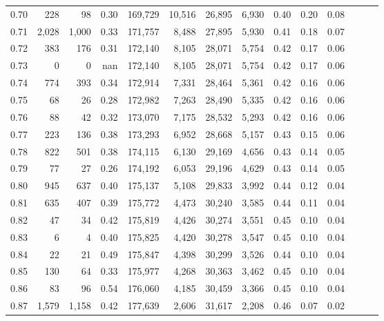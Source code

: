 \begin{tabular}{rrrrrrrrrrrrrr}
0.70 &     228 &     98 &  0.30 &  169,729 &   10,516 &  26,895 &   6,930 &  0.40 &  0.20 &      0.08 \\
0.71 &   2,028 &  1,000 &  0.33 &  171,757 &    8,488 &  27,895 &   5,930 &  0.41 &  0.18 &      0.07 \\
0.72 &     383 &    176 &  0.31 &  172,140 &    8,105 &  28,071 &   5,754 &  0.42 &  0.17 &      0.06 \\
0.73 &       0 &      0 &   nan &  172,140 &    8,105 &  28,071 &   5,754 &  0.42 &  0.17 &      0.06 \\
0.74 &     774 &    393 &  0.34 &  172,914 &    7,331 &  28,464 &   5,361 &  0.42 &  0.16 &      0.06 \\
0.75 &      68 &     26 &  0.28 &  172,982 &    7,263 &  28,490 &   5,335 &  0.42 &  0.16 &      0.06 \\
0.76 &      88 &     42 &  0.32 &  173,070 &    7,175 &  28,532 &   5,293 &  0.42 &  0.16 &      0.06 \\
0.77 &     223 &    136 &  0.38 &  173,293 &    6,952 &  28,668 &   5,157 &  0.43 &  0.15 &      0.06 \\
0.78 &     822 &    501 &  0.38 &  174,115 &    6,130 &  29,169 &   4,656 &  0.43 &  0.14 &      0.05 \\
0.79 &      77 &     27 &  0.26 &  174,192 &    6,053 &  29,196 &   4,629 &  0.43 &  0.14 &      0.05 \\
0.80 &     945 &    637 &  0.40 &  175,137 &    5,108 &  29,833 &   3,992 &  0.44 &  0.12 &      0.04 \\
0.81 &     635 &    407 &  0.39 &  175,772 &    4,473 &  30,240 &   3,585 &  0.44 &  0.11 &      0.04 \\
0.82 &      47 &     34 &  0.42 &  175,819 &    4,426 &  30,274 &   3,551 &  0.45 &  0.10 &      0.04 \\
0.83 &       6 &      4 &  0.40 &  175,825 &    4,420 &  30,278 &   3,547 &  0.45 &  0.10 &      0.04 \\
0.84 &      22 &     21 &  0.49 &  175,847 &    4,398 &  30,299 &   3,526 &  0.44 &  0.10 &      0.04 \\
0.85 &     130 &     64 &  0.33 &  175,977 &    4,268 &  30,363 &   3,462 &  0.45 &  0.10 &      0.04 \\
0.86 &      83 &     96 &  0.54 &  176,060 &    4,185 &  30,459 &   3,366 &  0.45 &  0.10 &      0.04 \\
0.87 &   1,579 &  1,158 &  0.42 &  177,639 &    2,606 &  31,617 &   2,208 &  0.46 &  0.07 &      0.02 \\

\end{tabular}

